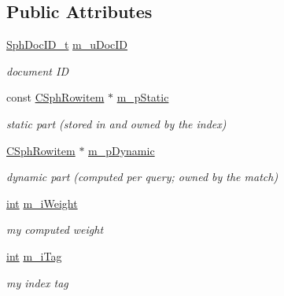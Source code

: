 \subsection*{Public Attributes}
\begin{DoxyCompactItemize}
\item 
\hyperlink{sphinx_8h_a3176771631c12a9e4897272003e6b447}{Sph\-Doc\-I\-D\-\_\-t} \hyperlink{classCSphMatch_a7998712d1849c157ffd02a395de4ad65}{m\-\_\-u\-Doc\-I\-D}
\begin{DoxyCompactList}\small\item\em document I\-D \end{DoxyCompactList}\item 
const \hyperlink{sphinx_8h_a6a2df0f05f3397df8b6e230fda6f852f}{C\-Sph\-Rowitem} $\ast$ \hyperlink{classCSphMatch_af83f609543b1dd0546fcb6ddf417495d}{m\-\_\-p\-Static}
\begin{DoxyCompactList}\small\item\em static part (stored in and owned by the index) \end{DoxyCompactList}\item 
\hyperlink{sphinx_8h_a6a2df0f05f3397df8b6e230fda6f852f}{C\-Sph\-Rowitem} $\ast$ \hyperlink{classCSphMatch_a0ed856b2f6cff288cda3e0a682a87ca5}{m\-\_\-p\-Dynamic}
\begin{DoxyCompactList}\small\item\em dynamic part (computed per query; owned by the match) \end{DoxyCompactList}\item 
\hyperlink{sphinxexpr_8cpp_a4a26e8f9cb8b736e0c4cbf4d16de985e}{int} \hyperlink{classCSphMatch_a5da02dba11f9375ea4e83d9b0e02b662}{m\-\_\-i\-Weight}
\begin{DoxyCompactList}\small\item\em my computed weight \end{DoxyCompactList}\item 
\hyperlink{sphinxexpr_8cpp_a4a26e8f9cb8b736e0c4cbf4d16de985e}{int} \hyperlink{classCSphMatch_adedc90b09bad49652b89d01766852ae9}{m\-\_\-i\-Tag}
\begin{DoxyCompactList}\small\item\em my index tag \end{DoxyCompactList}\end{DoxyCompactItemize}

